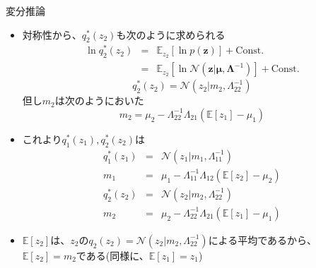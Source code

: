 \documentclass[dvipdfmx,notheorems,t]{beamer}
\begin{document}
\begin{frame}{変分推論}
\begin{itemize}
\begin{itemize}
		\item 対称性から、$q_2^*(z_2)$も次のように求められる
		\begin{eqnarray}
			\ln q_2^*(z_2) &=& \mathbb{E}_{z_2}[\ln p(\bm{z})] + \mathrm{Const.} \\
			&=& \mathbb{E}_{z_2}[\ln \mathcal{N}(\bm{z} | \bm{\mu}, \bm{\Lambda}^{-1})] + \mathrm{Const.}
		\end{eqnarray}
		\begin{equation}
			q_2^*(z_2) = \mathcal{N}(z_2 | m_2, \Lambda_{22}^{-1})
		\end{equation}
		但し$m_2$は次のようにおいた
		\begin{equation}
			m_2 = \mu_2 - \Lambda_{22}^{-1} \Lambda_{21} (\mathbb{E}[z_1] - \mu_1)
		\end{equation}
		
		\item これより$q_1^*(z_1), q_2^*(z_2)$は
		\begin{eqnarray}
			q_1^*(z_1) &=& \mathcal{N}(z_1 | m_1, \Lambda_{11}^{-1}) \\
			m_1 &=& \mu_1 - \Lambda_{11}^{-1} \Lambda_{12} (\mathbb{E}[z_2] - \mu_2) \\
			q_2^*(z_2) &=& \mathcal{N}(z_2 | m_2, \Lambda_{22}^{-1}) \\
			m_2 &=& \mu_2 - \Lambda_{22}^{-1} \Lambda_{21} (\mathbb{E}[z_1] - \mu_1)
		\end{eqnarray}
		
		\item $\mathbb{E}[z_2]$は、$z_2$の$q_2(z_2) = \mathcal{N}(z_2 | m_2, \Lambda_{22}^{-1})$による平均であるから、$\mathbb{E}[z_2] = m_2$である(同様に、$\mathbb{E}[z_1] = z_1$)
		\newline
		

\end{itemize}
\end{itemize}
\end{frame}
\end{document}
